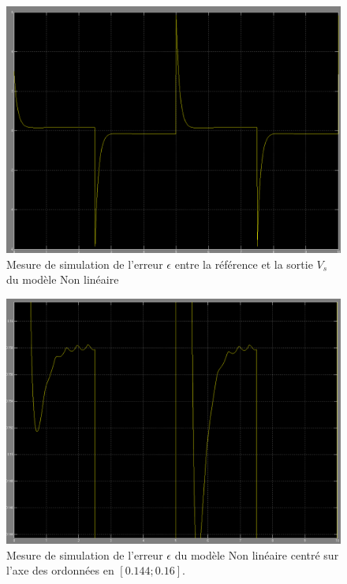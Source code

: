 \begin{figure}
\centering
\includegraphics[width = .9\textwidth]{./annexes/annexe3/NL_erreur-Consigne_Vs_RE.png}
\caption{Mesure de simulation de l'erreur $\epsilon$ entre la référence et la sortie $V_s$ du modèle Non linéaire\label{fig:SIMULINK_NL_erreur_reponse}}
\end{figure}

\begin{figure}
\centering
\includegraphics[width = .9\textwidth]{./annexes/annexe3/NL_erreur-Consigne_Vs_RE_zoom.png}
\caption{Mesure de simulation de l'erreur $\epsilon$ du modèle Non linéaire centré sur l'axe des ordonnées en $[0.144; 0.16].$\label{fig:SIMULINK_NL_erreur_reponse_zoom}}	
\end{figure}

